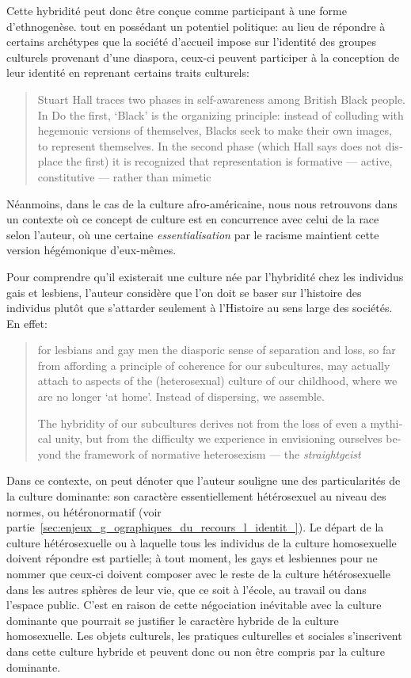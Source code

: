 Cette hybridité peut donc être conçue comme participant à une forme d'ethnogenèse. tout en possédant un potentiel politique: au lieu de répondre à certains archétypes que la société d'accueil impose sur l'identité des groupes culturels provenant d'une diaspora, ceux-ci peuvent participer à la conception de leur identité en reprenant certains traits culturels:
\foreignblockquote{english}[{\cite[277]{Sinfield1996}}][.]{Stuart Hall traces two phases in self-awareness among British Black people. In Do the first, `Black' is the organizing principle: instead of colluding with hegemonic versions of themselves, Blacks seek to make their own images, to represent themselves. In the second phase (which Hall says does not displace the first) it is recognized that representation is formative --- active, constitutive --- rather than mimetic}.
Néanmoins, dans le cas de la culture afro-américaine, nous nous retrouvons dans un contexte où ce concept de culture est en concurrence avec celui de la race selon l'auteur, où une certaine \emph{essentialisation} par le racisme maintient cette version hégémonique d'eux-mêmes.

Pour comprendre qu'il existerait une culture née par l'hybridité chez les individus gais et lesbiens, l'auteur considère que l'on doit se baser sur l'histoire des individus plutôt que s'attarder seulement à l'Histoire au sens large des sociétés. 
En effet: \foreignblockquote{english}[{\cite[280]{Sinfield1996}}][.]{\textelp{} for lesbians and gay men the diasporic sense of separation and loss, so far from affording a principle of coherence for our subcultures, may actually attach to aspects of the (heterosexual) culture of our childhood, where we are no longer `at home'. Instead of dispersing, we assemble.

  The hybridity of our subcultures derives not from the loss of even a mythical unity, but from the difficulty we experience in envisioning ourselves beyond the framework of normative heterosexism --- the \emph{straightgeist} \textelp{}}
Dans ce contexte, on peut dénoter que l'auteur souligne une des particularités de la culture dominante: son caractère essentiellement hétérosexuel au niveau des normes, ou hétéronormatif (voir partie~\ref{sec:enjeux_g_ographiques_du_recours_l_identit_}). 
Le départ de la culture hétérosexuelle ou  à laquelle tous les individus de la culture homosexuelle doivent répondre est partielle; à tout moment, les gays et lesbiennes pour ne nommer que ceux-ci doivent composer avec le reste de la culture hétérosexuelle dans les autres sphères de leur vie, que ce soit à l'école, au travail ou dans l'espace public. 
C'est en raison de cette négociation inévitable avec la culture dominante que pourrait se justifier le caractère hybride de la culture homosexuelle. 
Les objets culturels, les pratiques culturelles et sociales s'inscrivent dans cette culture hybride et peuvent donc ou non être compris par la culture dominante.


